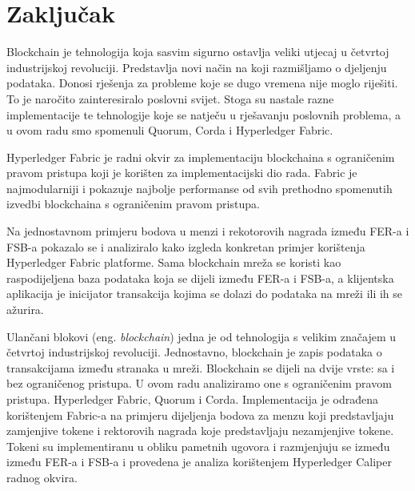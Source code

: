\documentclass[times, utf8, diplomski]{fer}
\begin{document}
\chapter{Zaključak}
Blockchain je tehnologija koja sasvim sigurno ostavlja veliki utjecaj u četvrtoj industrijskoj revoluciji. Predstavlja novi način na koji razmišljamo o djeljenju podataka. Donosi rješenja za probleme koje se dugo vremena nije moglo riješiti. To je naročito zainteresiralo poslovni svijet.  Stoga su nastale razne implementacije te tehnologije koje se natječu u rješavanju poslovnih problema, a u ovom radu smo spomenuli Quorum, Corda i Hyperledger Fabric. 

Hyperledger Fabric je radni okvir za implementaciju blockchaina s ograničenim pravom pristupa koji je korišten za implementacijski dio rada. Fabric je najmodularniji i pokazuje najbolje performanse od svih prethodno spomenutih izvedbi blockchaina s ograničenim pravom pristupa.

Na jednostavnom primjeru bodova u menzi i rekotorovih nagrada između FER-a i FSB-a pokazalo se i analiziralo kako izgleda konkretan primjer korištenja Hyperledger Fabric platforme. Sama blockchain mreža se koristi kao raspodijeljena baza podataka koja se dijeli između FER-a i FSB-a, a klijentska aplikacija je inicijator transakcija kojima se dolazi do podataka na mreži ili ih se ažurira. 




\begin{sazetak}
Ulančani blokovi (eng. \textit{blockchain}) jedna je od tehnologija s velikim značajem u četvrtoj industrijskoj revoluciji. Jednostavno, blockchain je zapis podataka o transakcijama između stranaka u mreži.  Blockchain se dijeli na dvije vrste: sa i bez ograničenog pristupa. U ovom radu analiziramo one s ograničenim pravom pristupa.  Hyperledger Fabric, Quorum i Corda. Implementacija je odrađena korištenjem Fabric-a na primjeru dijeljenja bodova za menzu koji predstavljaju zamjenjive tokene i rektorovih nagrada koje predstavljaju nezamjenjive tokene. Tokeni su implementiranu u obliku pametnih ugovora i razmjenjuju se između između FER-a i FSB-a i provedena je analiza korištenjem Hyperledger Caliper radnog okvira. 

\end{sazetak}

\begin{abstract}


\end{abstract}
\end{document}

